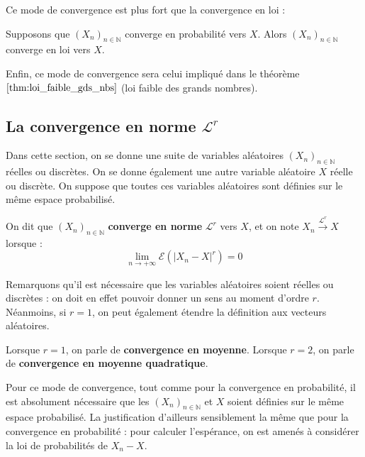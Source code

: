 \documentclass[../integ-proba.tex]{subfiles}
\begin{document}
    Ce mode de convergence est plus fort que la convergence en loi :

    \begin{prop}
        Supposons que $\left(X_n\right)_{n\in\mathbb{N}}$ converge en probabilité vers $X$.
        Alors $\left(X_n\right)_{n\in\mathbb{N}}$ converge en loi vers $X$.
    \end{prop}

    \begin{rem}
        Enfin, ce mode de convergence sera celui impliqué dans le théorème $\ref{thm:loi_faible_gds_nbs}$ (loi faible des grands nombres).
    \end{rem}

    \subsection{La convergence en norme $\mathcal{L}^r$}

    Dans cette section, on se donne une suite de variables aléatoires $\left(X_n\right)_{n\in\mathbb{N}}$ réelles ou discrètes.
    On se donne également une autre variable aléatoire $X$ réelle ou discrète.
    On suppose que toutes ces variables aléatoires sont définies sur le même espace probabilisé.

    \begin{defi}
        On dit que $\left(X_n\right)_{n\in\mathbb{N}}$ \textbf{converge en norme} $\mathcal{L}^r$ vers $X$, et on note $X_n \xrightarrow[]{\mathcal{L}^r} X$ lorsque :
        $$
        \lim_{n \to +\infty}\mathcal{E}\left(\left|X_n - X\right|^r\right) = 0
        $$
    \end{defi}

    \begin{rem}
        Remarquons qu'il est nécessaire que les variables aléatoires soient réelles ou discrètes : on doit en effet pouvoir donner un sens au moment d'ordre $r$.
        Néanmoins, si $r=1$, on peut également étendre la définition aux vecteurs aléatoires.
    \end{rem}

    \begin{rem}
        Lorsque $r=1$, on parle de \textbf{convergence en moyenne}.
        Lorsque $r=2$, on parle de \textbf{convergence en moyenne quadratique}.
    \end{rem}

    \begin{rem}
        Pour ce mode de convergence, tout comme pour la convergence en probabilité, il est absolument nécessaire que les $\left(X_n\right)_{n\in\mathbb{N}}$ et $X$ soient définies sur le même espace probabilisé.
        La justification d'ailleurs sensiblement la même que pour la convergence en probabilité : pour calculer l'espérance, on est amenés à considérer la loi de probabilités de $X_n - X$.
    \end{rem}
\end{document}
